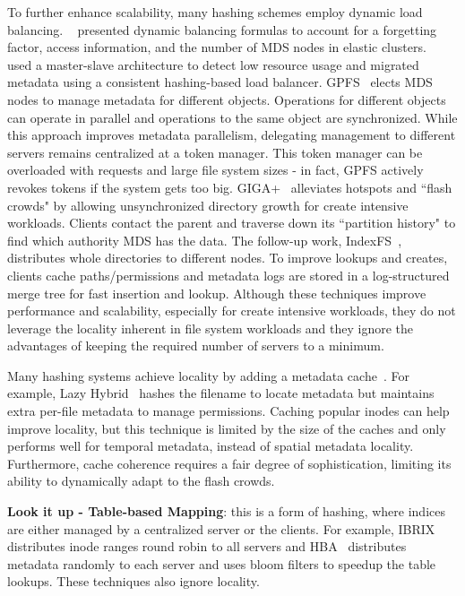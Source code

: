 To further enhance scalability, many hashing schemes employ dynamic load balancing. ~\cite{li:msst2006-dynamic} presented dynamic balancing formulas to account for a forgetting factor, access information, and the number of MDS nodes in elastic clusters.~\cite{xing:sc2009-skyfs} used a master-slave architecture to detect low resource usage and migrated metadata using a consistent hashing-based load balancer. GPFS~\cite{schmuck:fast2002-gpfs} elects MDS nodes to manage metadata for different objects. Operations for different objects can operate in parallel and operations to the same object are synchronized. While this approach improves metadata parallelism, delegating management to different servers remains centralized at a token manager. This token manager can be overloaded with requests and large file system sizes - in fact, GPFS actively revokes tokens if the system gets too big. GIGA+~\cite{patil:fast2011-giga+} alleviates hotspots and ``flash crowds" by allowing unsynchronized directory growth for create intensive workloads. Clients contact the parent and traverse down its ``partition history" to find which authority MDS has the data. The follow-up work, IndexFS~\cite{patil:fast2011-giga+}, distributes whole directories to different nodes. To improve lookups and creates, clients cache paths/permissions and metadata logs are stored in a log-structured merge tree for fast insertion and lookup.  Although these techniques improve performance and scalability, especially for create intensive workloads, they do not leverage the locality inherent in file system workloads and they ignore the advantages of keeping the required number of servers to a minimum. 

Many hashing systems achieve locality by adding a metadata cache~\cite{li:msst2006-dynamic, xing:sc2009-skyfs,zhu:pds2008-hba}. For example, Lazy Hybrid~\cite{brandt:mss2003-lh} hashes the filename to locate metadata but maintains extra per-file metadata to manage permissions. Caching popular inodes can help improve locality, but this technique is limited by the size of the caches and only performs well for temporal metadata, instead of spatial metadata locality. Furthermore, cache coherence requires a fair degree of sophistication, limiting its ability to dynamically adapt to the flash crowds.

\textbf{Look it up - Table-based Mapping}: this is a form of hashing, where indices are either managed by a centralized server or the clients. For example, IBRIX~\cite{hp:whitepaper2012-storeall} distributes inode ranges round robin to all servers and HBA~\cite{zhu:pds2008-hba} distributes metadata randomly to each server and uses bloom filters to speedup the table lookups. These techniques also ignore locality.

